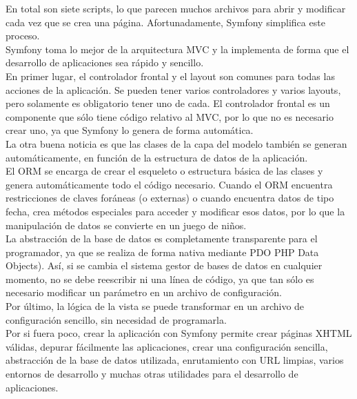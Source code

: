 En total son siete scripts, lo que parecen muchos archivos para abrir y modificar cada vez que se crea una página. Afortunadamente, Symfony simplifica este proceso.
\medskip\\
Symfony toma lo mejor de la arquitectura MVC y la implementa de forma que el desarrollo de aplicaciones sea rápido y sencillo.
\medskip\\
En primer lugar, el controlador frontal y el layout son comunes para todas las acciones de la aplicación. Se pueden tener varios controladores y varios layouts, pero solamente es obligatorio tener uno de cada. El controlador frontal es un componente que sólo tiene código relativo al MVC, por lo que no es necesario crear uno, ya que Symfony lo genera de forma automática.
\medskip\\
La otra buena noticia es que las clases de la capa del modelo también se generan automáticamente, en función de la estructura de datos de la aplicación.
\medskip\\
El ORM se encarga de crear el esqueleto o estructura básica de las clases y genera automáticamente todo el código necesario. Cuando el ORM encuentra restricciones de claves foráneas (o externas) o cuando encuentra datos de tipo fecha, crea métodos especiales para acceder y modificar esos datos, por lo que la manipulación de datos se convierte en un juego de niños.
\medskip\\
La abstracción de la base de datos es completamente transparente para el programador, ya que se realiza de forma nativa mediante PDO PHP Data Objects). Así, si se cambia el sistema gestor de bases de datos en cualquier momento, no se debe reescribir ni una línea de código, ya que tan sólo es necesario modificar un parámetro en un archivo de configuración.\\
Por último, la lógica de la vista se puede transformar en un archivo de configuración sencillo, sin necesidad de programarla.
\medskip\\
Por si fuera poco, crear la aplicación con Symfony permite crear páginas XHTML válidas, depurar fácilmente las aplicaciones, crear una configuración sencilla, abstracción de la base de datos utilizada, enrutamiento con URL limpias, varios entornos de desarrollo y muchas otras utilidades para el desarrollo de aplicaciones.